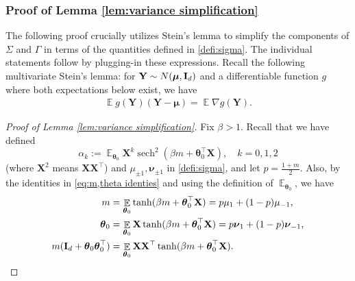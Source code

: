 \documentclass[preprint,reqno]{imsart}
\newcommand{\ttheta}{\boldsymbol{\theta}}
\newcommand{\I}{\mathbf{I}_{\mathnormal{d}}}
\DeclareMathOperator{\sech}{sech}
\DeclareMathOperator{\EE}{\mathbb{E}}
\newcommand{\X}{\mathbf{X}}
\begin{document}
\begin{appendix}
\subsubsection{Proof of Lemma \ref{lem:variance simplification}}\label{subsec:proof of variance matching}
{
%
The following proof crucially utilizes Stein's lemma to simplify the components of $\Sigma$ and $\Gamma$ in terms of the quantities defined in \cref{defi:sigma}. The individual statements follow by plugging-in these expressions. Recall the following multivariate Stein's lemma: for $\mathbf{Y} \sim N(\boldsymbol{\mu}, \I)$ and a differentiable function $g$ where both expectations below exist, we have
\begin{align}\label{eq:stein}
    \EE g(\mathbf{Y}) (\mathbf{Y}-\boldsymbol{\mu}) = \EE \nabla g(\mathbf{Y}).
\end{align}
}
\begin{proof}[Proof of Lemma \ref{lem:variance simplification}]
Fix $\beta > 1$.
Recall that we have defined $$\alpha_k := \EE_{\ttheta_0} \X^k \sech^2(\beta m + \ttheta_0^{\top} \X), \quad k = 0,1,2$$ 
(where $\X^2$ means $\X \X^{\top}$) and $\mu_{\pm 1}, \boldsymbol{\nu}_{\pm 1}$ in \cref{defi:sigma}, and let $p = \frac{1+m}{2}$. Also, by the identities in \eqref{eq:m,theta identies} and using the definition of $\EE_{\ttheta_0}$, we have
%
\begin{equation}\label{eq:m identities}
\begin{aligned}
    m &= \EE_{\ttheta_0} \tanh(\beta m + \ttheta_0^{\top} \X) = p \mu_1 + (1-p) \mu_{-1}, \\
    \ttheta_0 &= \EE_{\ttheta_0} \X \tanh(\beta m + \ttheta_0^{\top} \X) = p \boldsymbol{\nu}_1 + (1-p) \boldsymbol{\nu}_{-1} , \\
        m (\I + \ttheta_0 \ttheta_0^{\top} ) &= \EE_{\ttheta_0} \X \X^{\top} \tanh(\beta m + \ttheta_0^{\top} \X).
\end{aligned}
\end{equation}


\end{proof}
\end{appendix}
\end{document}
